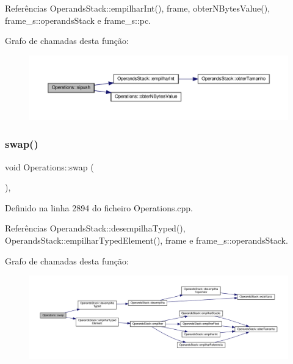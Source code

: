 Referências Operands\+Stack\+::empilhar\+Int(), frame, obter\+N\+Bytes\+Value(), frame\+\_\+s\+::operands\+Stack e frame\+\_\+s\+::pc.

Grafo de chamadas desta função\+:\nopagebreak
\begin{figure}[H]
\begin{center}
\leavevmode
\includegraphics[width=350pt]{classOperations_aed3838c73d7febfcacab9f101e6946ad_cgraph}
\end{center}
\end{figure}
\mbox{\label{classOperations_ad800d04ce11806455dd5b84a7ecd6144}} 
\subsubsection{\texorpdfstring{swap()}{swap()}}
{\footnotesize\ttfamily void Operations\+::swap (\begin{DoxyParamCaption}{ }\end{DoxyParamCaption})\hspace{0.3cm}{\ttfamily [static]}, {\ttfamily [private]}}



Definido na linha 2894 do ficheiro Operations.\+cpp.



Referências Operands\+Stack\+::desempilha\+Typed(), Operands\+Stack\+::empilhar\+Typed\+Element(), frame e frame\+\_\+s\+::operands\+Stack.

Grafo de chamadas desta função\+:\nopagebreak
\begin{figure}[H]
\begin{center}
\leavevmode
\includegraphics[width=350pt]{classOperations_ad800d04ce11806455dd5b84a7ecd6144_cgraph}
\end{center}
\end{figure}
\mbox{\label{classOperations_a72955f43cde98b73c503e1a8c1505352}} 
